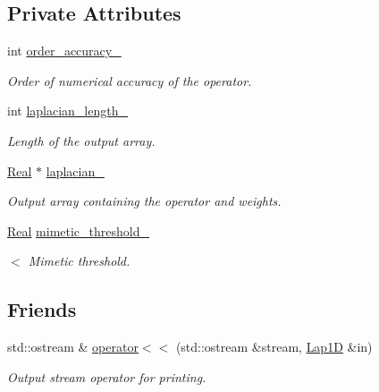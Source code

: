 \subsection*{Private Attributes}
\begin{DoxyCompactItemize}
\item 
int \hyperlink{classmtk_1_1Lap1D_a35d34c085b9cf6f9961a699dfb02fea6}{order\-\_\-accuracy\-\_\-}
\begin{DoxyCompactList}\small\item\em Order of numerical accuracy of the operator. \end{DoxyCompactList}\item 
int \hyperlink{classmtk_1_1Lap1D_a05578b0729f2bb4fe8bb442fc555fa80}{laplacian\-\_\-length\-\_\-}
\begin{DoxyCompactList}\small\item\em Length of the output array. \end{DoxyCompactList}\item 
\hyperlink{group__c01-roots_gac080bbbf5cbb5502c9f00405f894857d}{Real} $\ast$ \hyperlink{classmtk_1_1Lap1D_a64a3977527c00b4ef994d1bd549f82fd}{laplacian\-\_\-}
\begin{DoxyCompactList}\small\item\em Output array containing the operator and weights. \end{DoxyCompactList}\item 
\hyperlink{group__c01-roots_gac080bbbf5cbb5502c9f00405f894857d}{Real} \hyperlink{classmtk_1_1Lap1D_a20dce13067774c64dff892323d9c586e}{mimetic\-\_\-threshold\-\_\-}
\begin{DoxyCompactList}\small\item\em $<$ Mimetic threshold. \end{DoxyCompactList}\end{DoxyCompactItemize}
\subsection*{Friends}
\begin{DoxyCompactItemize}
\item 
std\-::ostream \& \hyperlink{classmtk_1_1Lap1D_a235390479381d4e95163674968a1ca7c}{operator$<$$<$} (std\-::ostream \&stream, \hyperlink{classmtk_1_1Lap1D}{Lap1\-D} \&in)
\begin{DoxyCompactList}\small\item\em Output stream operator for printing. \end{DoxyCompactList}\end{DoxyCompactItemize}


